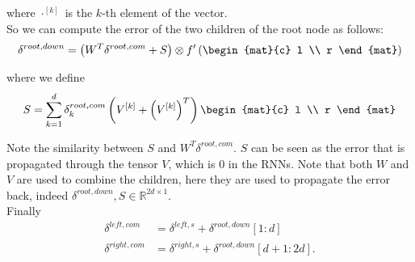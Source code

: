 where $\cdot^{[k]}$ is the $k$-th element of the vector.\\
So we can compute the error of the two children of the root node as follows:
\begin{equation}
	\delta^{root, down} = \left( W^T \delta^{root, com} + S \right) 
	\otimes f'\left(\begin{mat}{c} l \\ r \end{mat}\right)
\end{equation}

where we define
\begin{equation}
	S = \sum_{k=1}^d \delta^{root, com}_k 
	\left( V^{[k]} + \left(V^{[k]}\right)^T \right)
	\begin{mat}{c} l \\ r \end{mat}
\end{equation}

Note the similarity between $S$ and $W^T \delta^{root, com}$. $S$ can be seen as
the error that is propagated through the tensor $V$, which is $0$ in the RNNs. 
Note that both $W$ and $V$ are used to combine the children, here they are used 
to propagate the error back, indeed 
$\delta^{root, down}, S \in \mathbb{R}^{2d \times 1}$.\\
Finally 
\begin{align}
	\delta^{left, com} &= \delta^{left, s} + \delta^{root, down}[1:d] \\
	\delta^{right, com} &= \delta^{right, s} + \delta^{root, down}[d+1:2d].
\end{align}
